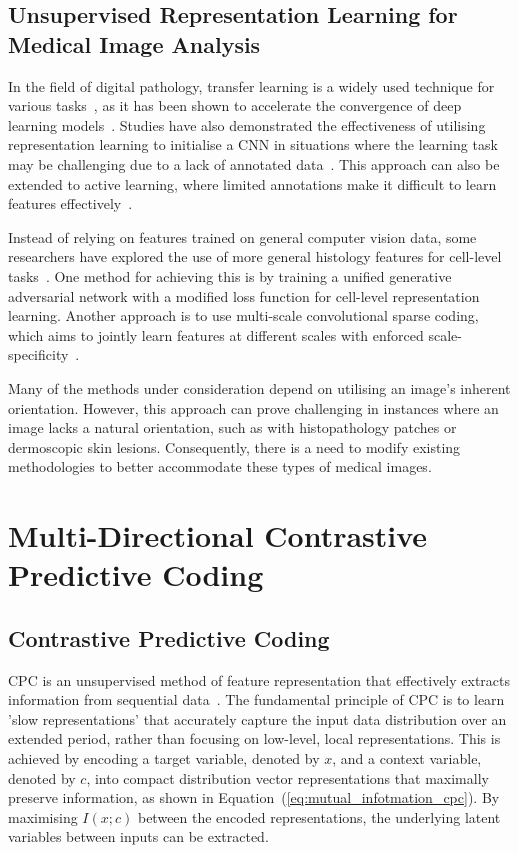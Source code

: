 \subsection{Unsupervised Representation Learning for \\Medical Image Analysis}
\label{subsec:unsupervise_representation_for_medical}
In the field of digital pathology, transfer learning is a widely used technique for various tasks~\citep{srinidhi2021deep}, as it has been shown to accelerate the convergence of deep learning models~\citep{bayramoglu2016transfer}. Studies have also demonstrated the effectiveness of utilising representation learning to initialise a CNN in situations where the learning task may be challenging due to a lack of annotated data~\citep{hou2016automatic}. This approach can also be extended to active learning, where limited annotations make it difficult to learn features effectively~\citep{carse2019active}.

Instead of relying on features trained on general computer vision data, some researchers have explored the use of more general histology features for cell-level tasks~\citep{hu2018unsupervised}. One method for achieving this is by training a unified generative adversarial network with a modified loss function for cell-level representation learning. Another approach is to use multi-scale convolutional sparse coding, which aims to jointly learn features at different scales with enforced scale-specificity~\citep{chang2017unsupervised}.

Many of the methods under consideration depend on utilising an image’s inherent orientation. However, this approach can prove challenging in instances where an image lacks a natural orientation, such as with histopathology patches or dermoscopic skin lesions. Consequently, there is a need to modify existing methodologies to better accommodate these types of medical images.



\section{Multi-Directional Contrastive Predictive Coding}
\label{sec:unsupervised_multi_directional_cpc}
\subsection{Contrastive Predictive Coding}
\label{subsec:unsupervised_cpc}
CPC is an unsupervised method of feature representation that effectively extracts information from sequential data~\citep{oord2018representation}. The fundamental principle of CPC is to learn 'slow representations' that accurately capture the input data distribution over an extended period, rather than focusing on low-level, local representations. This is achieved by encoding a target variable, denoted by $x$, and a context variable, denoted by $c$, into compact distribution vector representations that maximally preserve information, as shown in Equation~(\ref{eq:mutual_infotmation_cpc}). By maximising $I(x;c)$ between the encoded representations, the underlying latent variables between inputs can be extracted.


